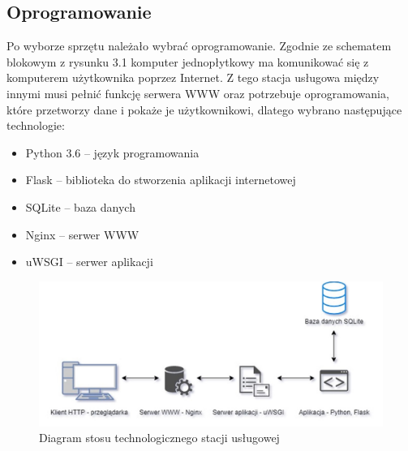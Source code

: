 \documentclass[12pt, twoside, openany]{mwrep}
\begin{document}
\subsection{Oprogramowanie}
Po wyborze sprzętu należało wybrać oprogramowanie. Zgodnie ze schematem blokowym z rysunku 3.1 komputer jednopłytkowy ma komunikować się z komputerem użytkownika poprzez Internet.  Z tego stacja usługowa między innymi musi pełnić funkcję serwera WWW oraz potrzebuje oprogramowania, które przetworzy dane i pokaże je użytkownikowi, dlatego wybrano następujące technologie:

\begin{itemize}
\item Python 3.6 – język programowania 
\item Flask – biblioteka do stworzenia aplikacji internetowej 
\item SQLite – baza danych
\item Nginx – serwer WWW 
\item uWSGI – serwer aplikacji
\end{itemize}

\begin{figure}[H]
\centering
\includegraphics[scale=0.43]{stos}
\caption{Diagram stosu technologicznego stacji usługowej }
\end{figure}
\end{document}
